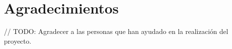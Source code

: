 \section*{Agradecimientos}

// TODO: Agradecer a las personas que han ayudado en la realización del proyecto.